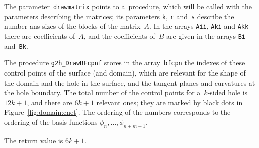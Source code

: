 The parameter~\texttt{drawmatrix} points to a~procedure, which will be called
with the parameters describing the matrices; its parameters
\texttt{k}, \texttt{r} and~\texttt{s} describe the number ans sizes of
the blocks of the matrix~$A$. In the arrays \texttt{Aii}, \texttt{Aki} and
\texttt{Akk} there are coefficients of~$A$, and the coefficients of~$B$
are given in the arrays \texttt{Bi} and~\texttt{Bk}.

\vspace{\bigskipamount}
The procedure \texttt{g2h\_DrawBFcpnf} stores in the array~\texttt{bfcpn}
the indexes of these control points of the surface (and domain), which are
relevant for the shape of the domain and the hole in the surface,
and the tangent planes and curvatures at the hole boundary.
The total number of the control points for a~$k$-sided hole is
$12k+1$, and there are $6k+1$ relevant ones; they are marked by black
dots in Figure~\ref{fig:domain:cnet}. The ordering of the numbers
corresponds to the ordering of the basis functions
$\phi_n,\ldots,\phi_{n+m-1}$.

The return value is $6k+1$.

\vspace{\bigskipamount}

